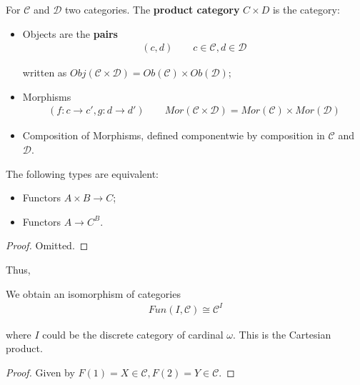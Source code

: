 \documentclass[Total.tex]{subfiles}
\begin{document}
				\begin{Def}
					For $\mathcal{C}$ and $\mathcal{D}$ two categories. The \textbf{product category} $C\times D$ is the category:
					\begin{itemize}
						\item Objects are the \textbf{pairs}
						\begin{gather*}
							(c,d)\qquad c\in \mathcal{C},d\in \mathcal{D}
						\end{gather*}
						
						written as $Obj(\mathcal{C}\times \mathcal{D})=Ob(\mathcal{C})\times Ob(\mathcal{D})$;
						\item Morphisms
						\begin{gather*}
							(f:c\rightarrow c',g:d\rightarrow d')\qquad Mor(\mathcal{C}\times \mathcal{D})=Mor(\mathcal{C})\times Mor(\mathcal{D})
						\end{gather*}
						\item Composition of Morphisms, defined componentwie by composition in $\mathcal{C}$ and $\mathcal{D}$.
					\end{itemize}
				\end{Def}
				
				\begin{lemma}
					The following types are equivalent:
					\begin{itemize}
						\item Functors $A\times B\rightarrow C$;
						\item Functors $A\rightarrow C^B$.
					\end{itemize}
				\end{lemma}
				\begin{proof}
					Omitted.
				\end{proof}
				
				Thus,
				
				\begin{proposition}
					We obtain an isomorphism of categories
					\begin{gather*}
						Fun(I,\mathcal{C})\cong \mathcal{C}^I
					\end{gather*}
					
					where $I$ could be the discrete category of cardinal $\omega$. This is the Cartesian product. 
				\end{proposition}
				\begin{proof}
					Given by $F(1)=X\in \mathcal{C},F(2)=Y\in \mathcal{C}$. 
				\end{proof}
				
\end{document}
